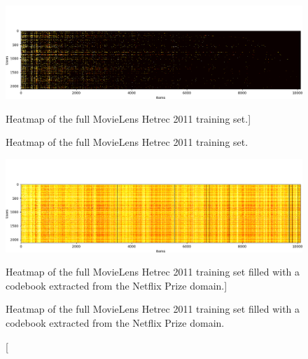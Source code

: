 \begin{figure}[htb]
  \centering
  \includegraphics[width=\textwidth]{pictures/movielens-full-target}
  \caption
  [Heatmap of the full MovieLens Hetrec 2011 training set.]
  {\protect\raggedright Heatmap of the full MovieLens Hetrec 2011 training set.}
  \includegraphics[width=\textwidth]{pictures/movielens-full-target-filled}
  \caption
  [Heatmap of the full MovieLens Hetrec 2011 training set filled with a codebook extracted from the Netflix Prize domain.]
  {\protect\raggedright Heatmap of the full MovieLens Hetrec 2011 training set filled with a codebook extracted from the Netflix Prize domain.}
\end{figure}


